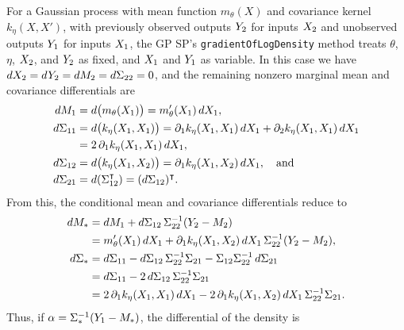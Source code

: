 \documentclass{article}
\newcommand{\Mu}{M}
\newcommand{\T}{\intercal}
\newcommand{\code}[1]{\texttt{#1}}
\newcommand{\n}[1]{\text{\rm #1}}
\newcommand{\zero}{\n0}
\newcommand{\one}{\n1}
\newcommand{\two}{\n2}
\begin{document}
For a Gaussian process with mean function $m_\theta(X)$ and covariance
 kernel $k_\eta(X, X')$, with previously observed outputs $Y_\two$ for
 inputs $X_\two$ and unobserved outputs $Y_\one$ for inputs $X_\one$,
 the GP SP's \code{gradientOfLogDensity} method treats $\theta$,
 $\eta$, $X_\two$, and $Y_\two$ as fixed, and $X_\one$ and $Y_\one$ as
 variable.
In this case we have $dX_\two = dY_\two = d\Mu_\two =
 d\Sigma_{\two\two} = \zero$, and the remaining nonzero marginal mean
 and covariance differentials are
%
\begin{align}
  d\Mu_\one
   &= d\bigl(m_\theta(X_\one)\bigr) = m_\theta'(X_\one)\,dX_\one, \\
  d\Sigma_{\one\one}
   &= d\bigl(k_\eta(X_\one, X_\one)\bigr)
    = \partial_\one k_\eta(X_\one, X_\one)\,dX_\one
      + \partial_\two k_\eta(X_\one, X_\one)\,dX_\one \\
   &= \two\,\partial_\one k_\eta(X_\one, X_\one)\,dX_\one, \\
  d\Sigma_{\one\two}
   &= d\bigl(k_\eta(X_\one, X_\two)\bigr)
    = \partial_\one k_\eta(X_\one, X_\two)\,dX_\one,
      \quad\text{and} \\
  d\Sigma_{\two\one}
   &= d(\Sigma_{\one\two}^\T)
    = (d\Sigma_{\one\two})^\T.
\end{align}
%
From this, the conditional mean and covariance differentials reduce to
%
\begin{align}
  d\Mu_*
   &= d\Mu_\one
      + d\Sigma_{\one\two}\,\Sigma_{\two\two}^{-\one} (Y_\two - \Mu_\two) \\
   &= m_\theta'(X_\one)\,dX_\one
      + \partial_\one k_\eta(X_\one, X_\two)\,dX_\one
        \,\Sigma_{\two\two}^{-\one} (Y_\two - \Mu_\two), \\
  d\Sigma_*
   &= d\Sigma_{\one\one}
      - d\Sigma_{\one\two}\,\Sigma_{\two\two}^{-\one} \Sigma_{\two\one}
      - \Sigma_{\one\two} \Sigma_{\two\two}^{-\one}\,d\Sigma_{\two\one} \\
   &= d\Sigma_{\one\one}
      - \two\,d\Sigma_{\one\two}\,\Sigma_{\two\two}^{-\one} \Sigma_{\two\one} \\
   &= \two\,\partial_\one k_\eta(X_\one, X_\one)\,dX_\one
      - \two\,\partial_\one k_\eta(X_\one, X_\two)\,dX_\one
        \,\Sigma_{\two\two}^{-\one} \Sigma_{\two\one}.
\end{align}
%
Thus, if $\alpha = \Sigma_*^{-\one}(Y_\one - \Mu_*)$, the differential
 of the density is
%
\end{document}
